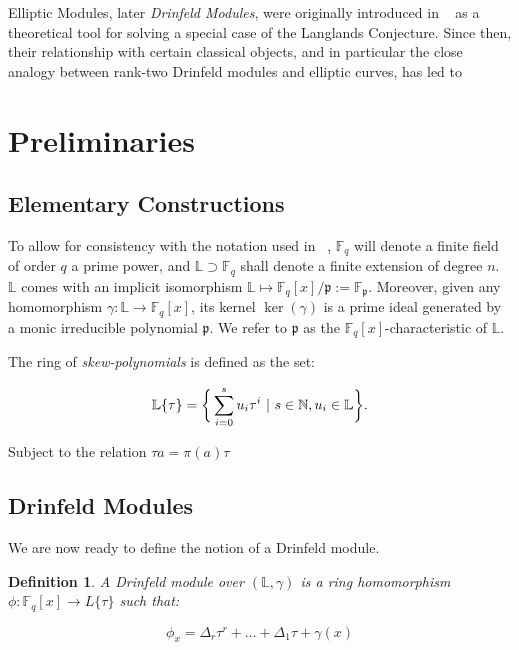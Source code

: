 \documentclass[sigconf]{acmart}
\newtheorem{definition}{Definition}
\newcommand{\F}{\mathbb{F}}
\newcommand{\N}{\mathbb{N}}
\renewcommand{\L}{\mathbb{L}}
\newcommand{\frakp}{\mathfrak{p}}
\begin{document}
Elliptic Modules, later \textit{Drinfeld Modules}, were originally introduced in ~\cite{Drinfeld74} as a theoretical tool for solving a special case of the Langlands Conjecture. Since then, their relationship with certain classical objects, and in particular the close analogy between rank-two Drinfeld modules and elliptic curves, has led to 

\section{Preliminaries}

\subsection{Elementary Constructions}
To allow for consistency with the notation used in ~\cite{MuslehSchost}, $\F_q$ will denote a finite field of order $q$ a prime power, and $\L \supset \F_q$ shall denote a finite extension of degree $n$. $\L$ comes with an implicit isomorphism $\L \mapsto \F_q[x]/\frakp := \F_{\frakp}$. Moreover, given any homomorphism $\gamma: \L \to \F_q[x]$, its kernel $\ker(\gamma)$ is a prime ideal generated by a monic irreducible polynomial $\mathfrak{p}$. We refer to $\mathfrak{p}$ as the $\mathbb{F}_q[x]$-characteristic of $\L$.

The ring of \textit{skew-polynomials} is defined as the set:

\begin{align}
    \L\{\tau\} = \bigg\{ \sum_{i=0}^su_i\tau^i \textnormal{ | } s \in \N, u_i \in \L \bigg\}.
\end{align}

Subject to the relation $\tau a = \pi(a) \tau$

\subsection{Drinfeld Modules}

We are now ready to define the notion of a Drinfeld module.

\begin{definition}
A \emph{Drinfeld module} over $(\L, \gamma)$ is a ring homomorphism $\phi: \F_q[x] \to L\{ \tau \}$ such that:
\end{definition}

\begin{equation}\label{definition}
    \phi_x = \Delta_r \tau^r + \ldots + \Delta_1 \tau + \gamma(x)
\end{equation}
\end{document}
